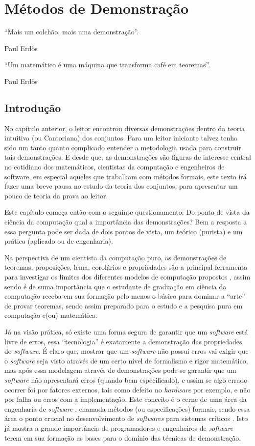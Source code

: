 \chapter{Métodos de Demonstração}\label{cap:Demonstracoes}

\epigraph{``Mais um colchão, mais uma demonstração''.}{Paul Erdös}

\epigraph{``Um matemático é uma máquina que transforma café em teoremas''.}{Paul Erdös}

\section{Introdução}\label{sec:Introducao-Demonstracoes}

No capítulo anterior, o leitor encontrou diversas demonstrações dentro da teoria intuitiva (ou Cantoriana) dos conjuntos. Para um leitor iniciante talvez tenha sido um tanto quanto complicado entender a metodologia usada para construir tais demonstrações. E desde que, as demonstrações são figuras de interesse central no cotidiano dos matemáticos, cientistas da computação e engenheiros de software, em especial aqueles que trabalham com métodos formais, este texto irá fazer uma breve pausa no estudo da teoria dos conjuntos, para apresentar um pouco de teoria da prova ao leitor.

Este capítulo começa então com o seguinte questionamento: Do ponto de vista da ciência da computação qual a importância das demonstrações? Bem a resposta a essa pergunta pode ser dada de dois pontos de vista,  um teórico (purista) e um prático (aplicado ou de engenharia).

Na perspectiva de um cientista da computação puro, as demonstrações de teoremas, proposições, lema, corolários e propriedades são a principal ferramenta para investigar os limites dos diferentes modelos de computação propostos \cite{hopcroft2008, linz2006}, assim sendo é de suma importância que o estudante de graduação em ciência da computação receba em sua formação pelo menos o básico para dominar a ``arte'' de provar teoremas, sendo assim preparado para o estudo e a pesquisa pura em computação e(ou) matemática.

Já na visão prática, só existe uma forma segura de garantir que um \textit{software} está livre de erros, essa ``tecnologia'' é exatamente a demonstração das propriedades do \textit{software}. É claro que, mostrar que um \textit{software} não possui erros vai exigir que o \textit{software} seja visto através de um certo nível de formalismo e rigor matemático, mas após essa modelagem através de demonstrações pode-se garantir que um \textit{software} não apresentará erros (quando bem especificado), e assim se algo errado ocorrer foi por fatores externos, tais como defeito no \textit{hardware} por exemplo, e não por falha ou erros com a implementação. Este conceito é o cerne de uma área da engenharia de \textit{software} \cite{pressman2016}, chamada métodos  (ou especificações) formais, sendo essa área o ponto crucial no desenvolvimento de \textit{softwares} para sistemas críticos \cite{sommerville2011}. Isto já mostra a grande importância de programadores e engenheiros de \textit{software} terem em sua formação as bases para o domínio das técnicas de demonstração.

